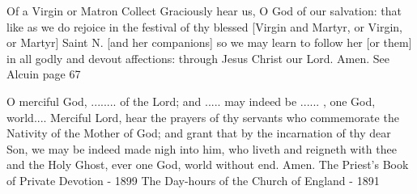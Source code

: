 Of a Virgin or Matron
Collect
Graciously hear us, O God of our salvation: that like as we do rejoice in the festival of thy blessed [Virgin and Martyr, {or} Virgin, {or} Martyr] Saint N. [and her companions] so we may learn to follow her [{or} them] in all godly and devout affections: through Jesus Christ our Lord. \R Amen.
See Alcuin page 67





O merciful God, ........ of the Lord; and ..... may indeed be ...... , one God, world....
Merciful Lord, hear the prayers of thy servants who commemorate the Nativity of the Mother of God; and grant that by the incarnation of thy dear Son, we may be indeed made nigh into him, who liveth and reigneth with thee and the Holy Ghost, ever one God, world without end.  Amen.
The Priest's Book of Private Devotion - 1899
The Day-hours of the Church of England - 1891